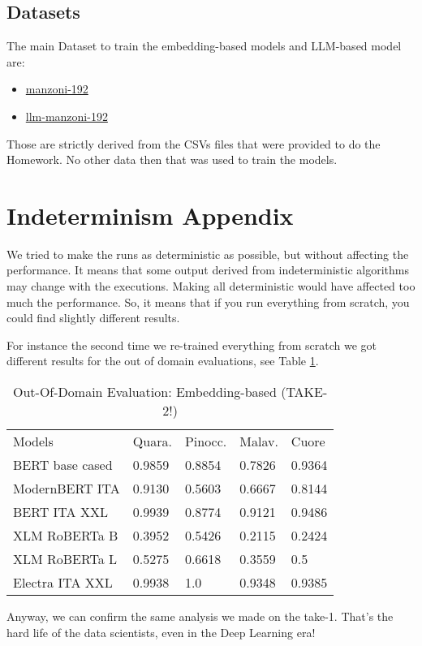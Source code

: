 \documentclass[11pt]{article}
\begin{document}
\subsection{Datasets}

The main Dataset to train the embedding-based models and LLM-based model are:

\begin{itemize}
	\item \href{https://huggingface.co/datasets/fax4ever/manzoni-192}{manzoni-192}
	\item \href{https://huggingface.co/datasets/fax4ever/llm-manzoni-192}{llm-manzoni-192}
\end{itemize}

Those are strictly derived from the CSVs files that were provided to do the Homework.
No other data then that was used to train the models.

\section{Indeterminism Appendix}
\label{sec:appendix3}

We tried to make the runs as deterministic as possible, but without affecting the
performance.
It means that some output derived from indeterministic algorithms may change with the executions.
Making all deterministic would have affected too much the performance.
So, it means that if you run everything from scratch, you could find slightly different results.

For instance the second time we re-trained everything from scratch we got different results
for the out of domain evaluations, see Table \ref{t3}.

\begin{table}[]
	\small
	\caption{Out-Of-Domain Evaluation: Embedding-based (TAKE-2!)}
	\begin{tabular}{lllll}
		Models & Quara. & Pinocc. & Malav. & Cuore \\
		BERT base cased & 0.9859      & 0.8854 & 0.7826        & 0.9364                 \\
		ModernBERT ITA  & 0.9130     & 0.5603   & 0.6667   & 0.8144                 \\
		BERT ITA XXL  & 0.9939     & 0.8774  & 0.9121     & 0.9486                 \\
		XLM RoBERTa B & 0.3952      & 0.5426   & 0.2115     & 0.2424                 \\
		XLM RoBERTa L & 0.5275       & 0.6618    & 0.3559   & 0.5               \\
		Electra ITA XXL  & 0.9938      & 1.0   & 0.9348    & 0.9385            
	\end{tabular}
	\label{t3}
\end{table}

Anyway, we can confirm the same analysis we made on the take-1.
That's the hard life of the data scientists, even in the Deep Learning era!


\end{document}
